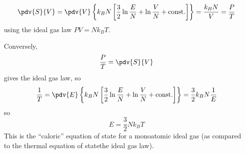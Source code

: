 \documentclass[a4paper,twoside,master.tex]{subfiles}
\begin{document}
\begin{equation}
    \pdv{S}{V} = \pdv{V} \left\{ k_B N \left[ \frac{3}{2} \ln{\frac{E}{N}} + \ln{\frac{V}{N}} + \text{const.}\right] \right\} = \frac{k_B N}{V} = \frac{P}{T}
\end{equation}
using the ideal gas law $ PV = N k_B T $.

Conversely,
\begin{equation}
    \frac{P}{T} = \pdv{S}{V}
\end{equation}
gives the ideal gas law, so
\begin{equation}
    \frac{1}{T} = \pdv{E}\left\{ k_B N \left[ \frac{3}{2} \ln{\frac{E}{N}} + \ln{\frac{V}{N}} + \text{const.} \right] \right\} = \frac{3}{2} k_B N \frac{1}{E}
\end{equation}
so
\begin{equation}
    E = \frac{3}{2} N k_B T
\end{equation}
This is the ``caloric'' equation of state for a monoatomic ideal gas (as compared to the thermal equation of state\textemdash the ideal gas law).
\end{document}
